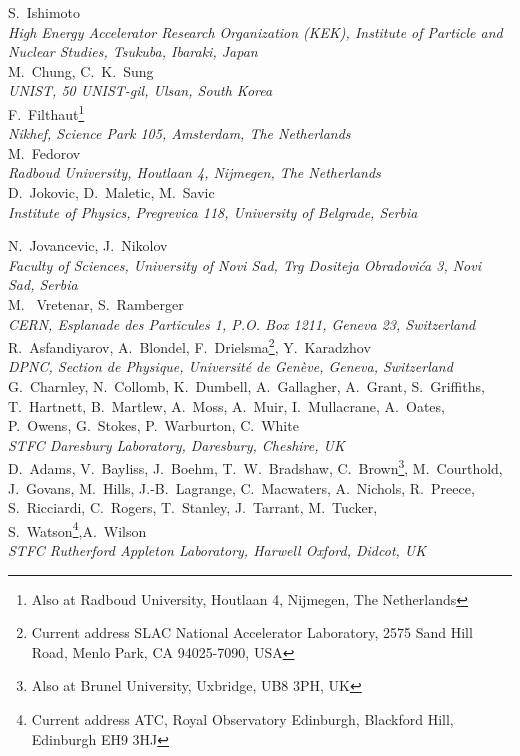 S.~Ishimoto
\\{\it
High Energy Accelerator Research Organization (KEK), Institute of Particle and Nuclear Studies, Tsukuba, Ibaraki, Japan
}\\


M.~Chung, C.~K.~Sung
\\{\it 
UNIST, 50 UNIST-gil, Ulsan, South Korea
}\\

F.~Filthaut\footnote{Also at Radboud University, Houtlaan 4, Nijmegen, The Netherlands}
\\{\it
Nikhef, Science Park 105, Amsterdam, The Netherlands
}\\

M.~Fedorov
\\{\it
Radboud University, Houtlaan 4, Nijmegen, The Netherlands
}\\

D.~Jokovic, D.~Maletic, M.~Savic
\\{\it
Institute of Physics, Pregrevica 118, University of Belgrade, Serbia
}\\

\newpage

N.~Jovancevic, J.~Nikolov
\\{\it
Faculty of Sciences, University of Novi Sad, Trg Dositeja Obradovi\'{c}a 3, Novi Sad, Serbia
}\\

M. ~Vretenar, S.~Ramberger
\\{\it
CERN, Esplanade des Particules 1, P.O. Box 1211, Geneva 23, Switzerland
}\\

R.~Asfandiyarov, A.~Blondel, F.~Drielsma\footnote{Current address SLAC National Accelerator Laboratory, 2575 Sand Hill Road, Menlo Park, CA 94025-7090, USA}, Y.~Karadzhov 
\\{\it
DPNC, Section de Physique, Universit\'e de Gen\`eve, Geneva, Switzerland
}\\

G.~Charnley, N.~Collomb,  K.~Dumbell, A.~Gallagher, A.~Grant, S.~Griffiths,  T.~Hartnett, B.~Martlew, 
A.~Moss, A.~Muir, I.~Mullacrane, A.~Oates, P.~Owens, G.~Stokes, P.~Warburton, C.~White
\\{\it
STFC Daresbury Laboratory, Daresbury, Cheshire, UK
}\\

D.~Adams,   V.~Bayliss, J.~Boehm, T.~W.~Bradshaw, C.~Brown\footnote{Also at Brunel University, Uxbridge, UB8 3PH, UK}, M.~Courthold,  J.~Govans, M.~Hills, J.-B.~Lagrange, C.~Macwaters, A.~Nichols, R.~Preece, S.~Ricciardi, C.~Rogers, T.~Stanley, J.~Tarrant,  
M.~Tucker, S.~Watson\footnote{Current address ATC, Royal Observatory Edinburgh, Blackford Hill,  Edinburgh EH9 3HJ},A.~Wilson
\\{\it
 STFC Rutherford Appleton Laboratory, Harwell Oxford, Didcot, UK
}\\

